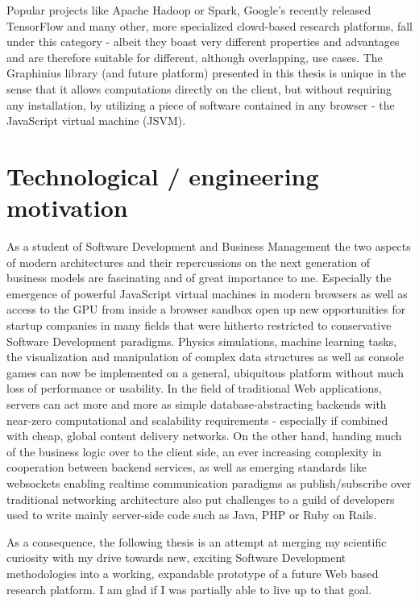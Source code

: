Popular projects like Apache Hadoop or Spark, Google's recently released TensorFlow and many other, more specialized clowd-based research platforms, fall under this category - albeit they boast very different properties and advantages and are therefore suitable for different, although overlapping, use cases. The Graphinius library (and future platform) presented in this thesis is unique in the sense that it allows computations directly on the client, but without requiring any installation, by utilizing a piece of software contained in any browser - the JavaScript virtual machine (JSVM). 


\section{Technological / engineering motivation}
\label{sect:technological_motivation}

As a student of Software Development and Business Management the two aspects of modern architectures and their repercussions on the next generation of business models are fascinating and of great importance to me. Especially the emergence of powerful JavaScript virtual machines in modern browsers as well as access to the GPU from inside a browser sandbox open up new opportunities for startup companies in many fields that were hitherto restricted to conservative Software Development paradigms. Physics simulations, machine learning tasks, the visualization and manipulation of complex data structures as well as console games can now be implemented on a general, ubiquitous platform without much loss of performance or usability. In the field of traditional Web applications, servers can act more and more as simple database-abstracting backends with near-zero computational and scalability requirements - especially if combined with cheap, global content delivery networks. On the other hand, handing much of the business logic over to the client side, an ever increasing complexity in cooperation between backend services, as well as emerging standards like websockets enabling realtime communication paradigms as publish/subscribe over traditional networking architecture also put challenges to a guild of developers used to write mainly server-side code such as Java, PHP or Ruby on Rails.

As a consequence, the following thesis is an attempt at merging my scientific curiosity with my drive towards new, exciting Software Development methodologies into a working, expandable prototype of a future Web based research platform. I am glad if I was partially able to live up to that goal.


